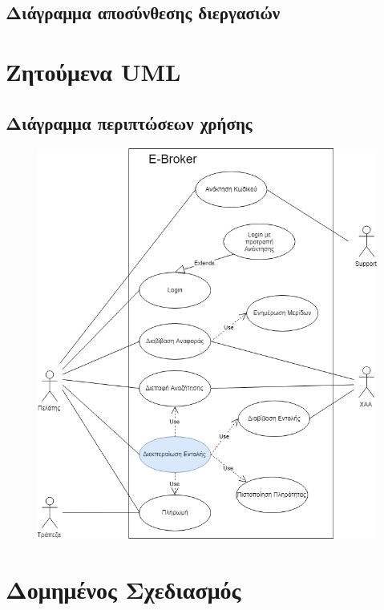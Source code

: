 \documentclass{article}
\begin{document}
\newpage
\subsection{Διάγραμμα αποσύνθεσης διεργασιών}

\newpage
\section{Ζητούμενα UML}
\subsection{Διάγραμμα περιπτώσεων χρήσης}
\begin{figure}[!h]
	\includegraphics[width=\linewidth]{../UML/Use_Case_Diagram.png}
\end{figure}

\newpage
\section{Δομημένος Σχεδιασμός}
\end{document}
